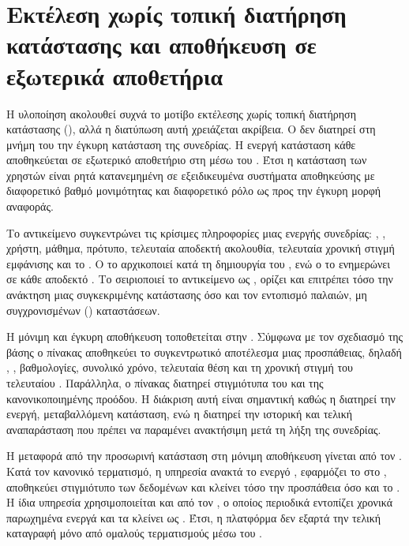 \section{Εκτέλεση χωρίς τοπική διατήρηση κατάστασης και αποθήκευση σε εξωτερικά αποθετήρια}
\label{sec:stateless_externalized_state}

Η υλοποίηση ακολουθεί συχνά το μοτίβο εκτέλεσης χωρίς τοπική διατήρηση κατάστασης (), αλλά η διατύπωση αυτή χρειάζεται ακρίβεια. Ο  δεν διατηρεί στη μνήμη του  την έγκυρη κατάσταση της συνεδρίας. Η ενεργή κατάσταση κάθε  αποθηκεύεται σε εξωτερικό αποθετήριο στη  μέσω του \texttt{}. Έτσι η κατάσταση των χρηστών είναι ρητά κατανεμημένη σε εξειδικευμένα συστήματα αποθηκεύσης με διαφορετικό βαθμό μονιμότητας και διαφορετικό ρόλο ως προς την έγκυρη μορφή αναφοράς.

Το αντικείμενο \texttt{} συγκεντρώνει τις κρίσιμες πληροφορίες μιας ενεργής συνεδρίας: , , χρήστη, μάθημα, πρότυπο, τελευταία αποδεκτή ακολουθία, τελευταία χρονική στιγμή εμφάνισης και το \texttt{}. Ο \texttt{} το αρχικοποιεί κατά τη δημιουργία του , ενώ ο \texttt{} το ενημερώνει σε κάθε αποδεκτό . Το \texttt{} σειριοποιεί το αντικείμενο ως , ορίζει  και επιτρέπει τόσο την ανάκτηση μιας συγκεκριμένης κατάστασης όσο και τον εντοπισμό παλαιών, μη συγχρονισμένων () καταστάσεων.

Η μόνιμη και έγκυρη αποθήκευση τοποθετείται στην . Σύμφωνα με τον σχεδιασμό της βάσης ο πίνακας \texttt{} αποθηκεύει το συγκεντρωτικό αποτέλεσμα μιας προσπάθειας, δηλαδή , , βαθμολογίες, συνολικό χρόνο, τελευταία θέση και τη χρονική στιγμή του τελευταίου . Παράλληλα, ο πίνακας \texttt{} διατηρεί στιγμιότυπα του  και της κανονικοποιημένης προόδου. Η διάκριση αυτή είναι σημαντική καθώς η  διατηρεί την ενεργή, μεταβαλλόμενη κατάσταση, ενώ η  διατηρεί την ιστορική και τελική αναπαράσταση που πρέπει να παραμένει ανακτήσιμη μετά τη λήξη της συνεδρίας.

Η μεταφορά από την προσωρινή κατάσταση στη μόνιμη αποθήκευση γίνεται από τον \texttt{}. Κατά τον κανονικό τερματισμό, η υπηρεσία ανακτά το ενεργό , εφαρμόζει το \texttt{} στο , αποθηκεύει στιγμιότυπο των δεδομένων και κλείνει τόσο την προσπάθεια όσο και το . Η ίδια υπηρεσία χρησιμοποιείται και από τον \texttt{}, ο οποίος περιοδικά εντοπίζει χρονικά παρωχημένα ενεργά  και τα κλείνει ως . Έτσι, η πλατφόρμα δεν εξαρτά την τελική καταγραφή μόνο από ομαλούς τερματισμούς μέσω του .

